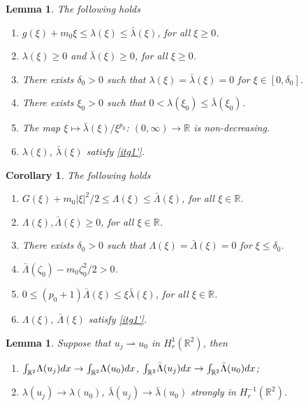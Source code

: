 \documentclass[11pt,leqno,twoside,reqno]{amsart}
\numberwithin{equation}{section}
\newtheorem{lemma}[theorem]{Lemma}
\newtheorem{cor}[theorem]{Corollary}
\begin{document}
\begin{lemma}\label{proplambda}
The following holds
\begin{enumerate}[label=(\roman*),ref=\roman*]
\item $g(\xi)+m_0\xi{\leqslant} \lambda(\xi){\leqslant} \bar{\lambda}(\xi)$, for all $\xi{\geqslant} 0$.
\item $\lambda(\xi){\geqslant} 0$ and $\bar{\lambda}(\xi){\geqslant} 0$, for all $\xi{\geqslant} 0$.
\item There exists $\delta_0>0$ such that $\lambda(\xi)=\bar{\lambda}(\xi)=0$ for $\xi\in [0,\delta_0]$.
\item There exists $\xi_0>0$ such that $0<\lambda(\xi_0){\leqslant} \bar{\lambda}(\xi_0)$.
\item The map $\xi\mapsto{\bar{\lambda}(\xi)}/{\xi^{p_0}}$: $(0,\infty)\rightarrow\mathbb R$ is non-decreasing. 
\item $\lambda(\xi)$, $\bar{\lambda}(\xi)$ satisfy \eqref{itg1'}.
\end{enumerate}
\end{lemma}

\begin{cor}\label{propLambda}
The following holds
\begin{enumerate}[label=(\roman*),ref=\roman*]
\item \label{i32}$G(\xi)+m_0|\xi|^2/2{\leqslant} {\Lambda}(\xi){\leqslant} \bar{\Lambda}(\xi)$, for all $\xi\in\mathbb{R}$.
\item ${\Lambda}(\xi),\bar{\Lambda}(\xi){\geqslant} 0$, for all $\xi\in\mathbb{R}$.
\item There exists $\delta_0>0$ such that ${\Lambda}(\xi)=\bar{\Lambda}(\xi)=0$ for $\xi{\leqslant} \delta_0$.
\item $\bar{\Lambda}(\zeta_0)-m_0\zeta_0^2 /2>0$.
\item $0{\leqslant} (p_0+1)\bar{\Lambda}(\xi){\leqslant}\xi\bar{\lambda}(\xi)$, for all $\xi\in\mathbb{R}$.
\item $\Lambda(\xi)$, $\bar{\Lambda}(\xi)$ satisfy \eqref{itg1'}.
\end{enumerate}
\end{cor}

\begin{lemma}\label{lambdacomp}
Suppose that $ u_j\rightharpoonup  u_0$ in $H^1_r({{\mathbb{R}^2}})$, then
\begin{enumerate}[label=(\roman*),ref=\roman*]
\item ${\displaystyle} {\int_{{\mathbb{R}^2}}}{\Lambda}(u_j)dx \to {\int_{{\mathbb{R}^2}}} {\Lambda}(u_0) dx$, ${\displaystyle} {\int_{{\mathbb{R}^2}}}\bar{\Lambda}(u_j)dx \to {\int_{{\mathbb{R}^2}}} \bar{\Lambda}(u_0) dx$;
\medskip
\item ${\lambda}(u_j) \to  {\lambda}(u_0)$, $\bar{\lambda}(u_j) \to  \bar{\lambda}(u_0)$ strongly in $H^{-1}_r({{\mathbb{R}^2}})$.
\end{enumerate}
\end{lemma}
\end{document}
